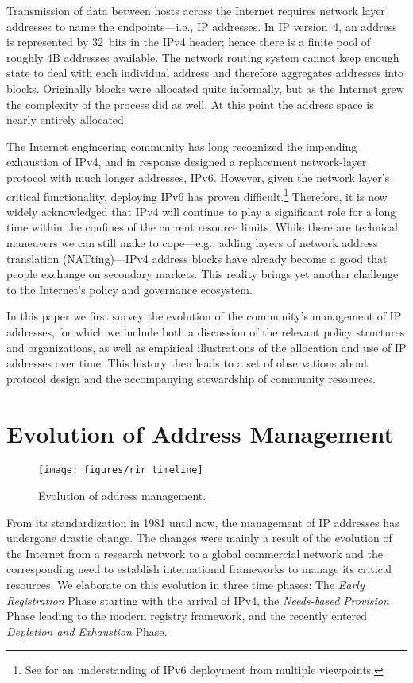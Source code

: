 \documentclass[letter]{sigcomm-alternate}
\begin{document}
Transmission of data between hosts across the Internet requires network
layer addresses to name the endpoints---i.e., IP addresses.  In IP
version~4, an address is represented by 32~bits in the IPv4 header;
hence there is a finite pool of roughly 4B addresses available.  The
network routing system cannot keep enough state to deal with each
individual address and therefore aggregates addresses into blocks.
Originally blocks were allocated quite informally, but as the Internet
grew the complexity of the process did as well.  At this point the
address space is nearly entirely allocated.

The Internet engineering community has long recognized the impending exhaustion
of IPv4, and in response designed a replacement network-layer protocol with
much longer addresses, IPv6.  However, given the network layer's critical
functionality, deploying IPv6 has proven difficult.\footnote{
	See \cite{ipv6sigcomm14} for an understanding of IPv6 deployment from 
	multiple viewpoints.
}  
Therefore, it is now widely acknowledged that IPv4 will continue to play a
significant role for a long time within the confines of the current resource
limits.  While there are technical maneuvers we can still make to cope---e.g.,
adding layers of network address translation (NATting)---IPv4 address blocks
have already become a good that people exchange on secondary markets.  This
reality brings yet another challenge to the Internet's policy and governance
ecosystem.

In this paper we first survey the evolution of the community's management of IP
addresses, for which we include both a discussion of the relevant policy
structures and organizations, as well as empirical illustrations of the
allocation and use of IP addresses over time.  This history then leads to a
set of observations about protocol design and the accompanying stewardship of
community resources.

\section{Evolution of Address Management}
\begin{figure} \centering
\texttt{[image: figures/rir\_timeline]} \caption{Evolution
of address management.} 
 \vspace{-1em}
\label{fig:rir_timeline} 
\end{figure}

From its standardization in 1981 \cite{rfc791} until now, the management
of IP addresses has undergone drastic change.  The changes were mainly a
result of the evolution of the Internet from a research network to a
global commercial network and the corresponding need to establish
international frameworks to manage its critical resources.  We
elaborate on this evolution in three time phases: The \textit{Early
  Registration} Phase starting with the arrival of IPv4, the
\textit{Needs-based Provision} Phase leading to the modern registry
framework, and the recently entered \textit{Depletion and Exhaustion} Phase. 
\end{document}
